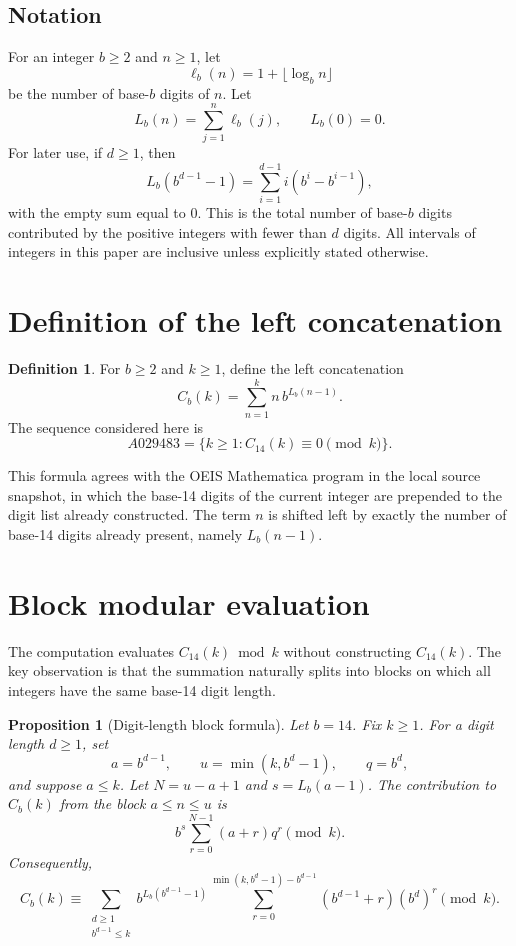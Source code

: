 \documentclass[11pt]{article}
\newtheorem{proposition}{Proposition}
\theoremstyle{definition}
\newtheorem{definition}{Definition}
\theoremstyle{remark}
\begin{document}
\subsection*{Notation}

For an integer \(b\ge 2\) and \(n\ge 1\), let
\[
  \ell_b(n)=1+\lfloor \log_b n\rfloor
\]
be the number of base-\(b\) digits of \(n\).  Let
\[
  L_b(n)=\sum_{j=1}^{n}\ell_b(j), \qquad L_b(0)=0.
\]
For later use, if \(d\ge 1\), then
\[
  L_b(b^{d-1}-1)=\sum_{i=1}^{d-1} i(b^i-b^{i-1}),
\]
with the empty sum equal to \(0\).  This is the total number of base-\(b\)
digits contributed by the positive integers with fewer than \(d\) digits.
All intervals of integers in this paper are inclusive unless explicitly
stated otherwise.

\section{Definition of the left concatenation}
\label{sec:def}

\begin{definition}
For \(b\ge 2\) and \(k\ge 1\), define the left concatenation
\[
  C_b(k)=\sum_{n=1}^{k} n\,b^{L_b(n-1)}.
\]
The sequence considered here is
\[
  A029483=\{k\ge 1 : C_{14}(k)\equiv 0 \pmod{k}\}.
\]
\end{definition}

This formula agrees with the OEIS Mathematica program in the local source
snapshot, in which the base-14 digits of the current integer are prepended to
the digit list already constructed.  The term \(n\) is shifted left by exactly
the number of base-14 digits already present, namely \(L_b(n-1)\).

\section{Block modular evaluation}
\label{sec:block}

The computation evaluates \(C_{14}(k)\bmod k\) without constructing
\(C_{14}(k)\).  The key observation is that the summation naturally splits
into blocks on which all integers have the same base-14 digit length.

\begin{proposition}[Digit-length block formula]
\label{prop:block}
Let \(b=14\).  Fix \(k\ge 1\).  For a digit length \(d\ge 1\), set
\[
  a=b^{d-1}, \qquad u=\min(k,b^d-1), \qquad q=b^d,
\]
and suppose \(a\le k\).  Let \(N=u-a+1\) and \(s=L_b(a-1)\).  The
contribution to \(C_b(k)\) from the block \(a\le n\le u\) is
\[
  b^s\sum_{r=0}^{N-1}(a+r)q^r \pmod{k}.
\]
Consequently,
\[
  C_b(k)\equiv
  \sum_{\substack{d\ge 1\\ b^{d-1}\le k}}
  b^{L_b(b^{d-1}-1)}
  \sum_{r=0}^{\min(k,b^d-1)-b^{d-1}}(b^{d-1}+r)(b^d)^r
  \pmod{k}.
\]
\end{proposition}
\end{document}
